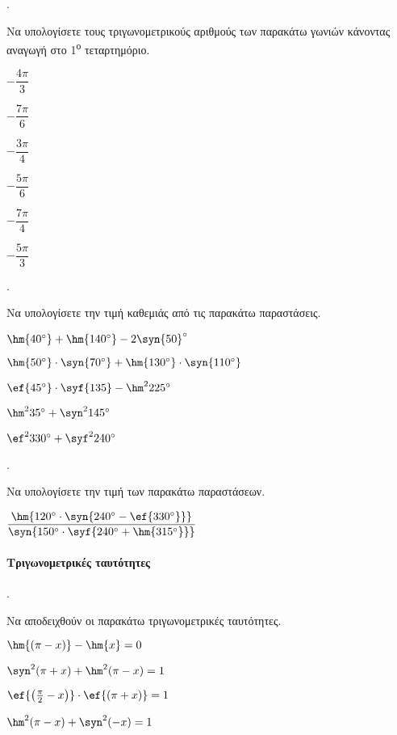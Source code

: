 \documentclass[11pt,a4paper,twocolumn]{article}
\newcounter{askhsh}
\newcommand{\askhsh}{\large\theaskhsh.\ \addtocounter{askhsh}{1}}
\newcommand{\tss}[1]{\textsuperscript{#1}}
\begin{document}
\askhsh Να υπολογίσετε τους τριγωνομετρικούς αριθμούς των παρακάτω γωνιών κάνοντας αναγωγή στο 1\tss{ο} τεταρτημόριο.
\begin{multicols}{3}
\begin{alist}
\item $ -\dfrac{4\pi}{3} $
\item $ -\dfrac{7\pi}{6} $
\item $ -\dfrac{3\pi}{4} $
\item $ -\dfrac{5\pi}{6} $
\item $ -\dfrac{7\pi}{4} $
\item $ -\dfrac{5\pi}{3} $
\end{alist}
\end{multicols}
\askhsh Να υπολογίσετε την τιμή καθεμιάς από τις παρακάτω παραστάσεις.
\begin{alist}
\item $ \hm{40\degree}+\hm{140\degree}-2\syn{50}\degree $
\item $ \hm{50\degree}\cdot\syn{70\degree}+\hm{130\degree}\cdot\syn{110\degree} $
\item $ \ef{45\degree}\cdot \syf{135}-\hm^2{225\degree} $
\item $ \hm^2{35\degree}+\syn^2{145\degree} $
\item $ \ef^2{330\degree}+\syf^2{240\degree} $
\end{alist}
\askhsh Να υπολογίσετε την τιμή των παρακάτω παραστάσεων.
\begin{alist}
\item $\dfrac{\hm{120\degree\cdot\syn{240\degree-\ef{330\degree}}}}{\syn{150\degree\cdot\syf{240\degree+\hm{315\degree}}}}$
\end{alist}
\paragraph{Τριγωνομετρικές ταυτότητες}
\askhsh
Να αποδειχθούν οι παρακάτω τριγωνομετρικές ταυτότητες.
\begin{alist}
\item $ \hm{\left( \pi-x\right) }-\hm{x}=0 $
\item $ \syn^2{(\pi+x)}+\hm^2{(\pi-x)}=1 $
\item $ \ef{\left( \frac{\pi}{2}-x\right) }\cdot\ef{\left( \pi+x\right) }=1 $
\item $ \hm^2{(\pi-x)}+\syn^2{(-x)}=1 $
\end{alist}
\end{document}
